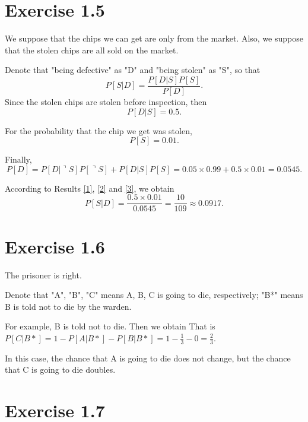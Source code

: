 \section*{Exercise 1.5}
We suppose that the chips we can get are only from the market. Also, we suppose that the stolen chips are all sold on the market.

Denote that "being defective" as "D" and "being stolen" as "S", so that
\[
    P[S|D]=\frac{P[D|S]P[S]}{P[D]}.
\]
Since the stolen chips are stolen before inspection, then 
\begin{equation}\label{1}
    P[D|S]=0.5.
\end{equation}

For the probability that the chip we get was stolen,
\begin{equation}\label{2}
    P[S]=0.01.
\end{equation}

Finally,
\begin{equation}\label{3} 
    P[D]=P[D|\urcorner S]P[\urcorner S]+P[D|S]P[S]=0.05\times0.99+0.5\times0.01=0.0545.
\end{equation}

According to Results \ref{1}, \ref{2} and \ref{3}, we obtain
\[
    P[S|D]=\frac{0.5\times0.01}{0.0545}=\frac{10}{109}\approx0.0917.
\]

\section*{Exercise 1.6}
The prisoner is right.

Denote that "A", "B", "C" means A, B, C is going to die, respectively; "B*" means B is told not to die by the warden.

For example, B is told not to die. Then we obtain
That is $P[C|B*]=1-P[A|B*]-P[B|B*]=1-\frac{1}{3}-0=\frac{2}{3}$.

In this case, the chance that A is going to die does not change, but the chance that C is going to die doubles.

\section*{Exercise 1.7}

